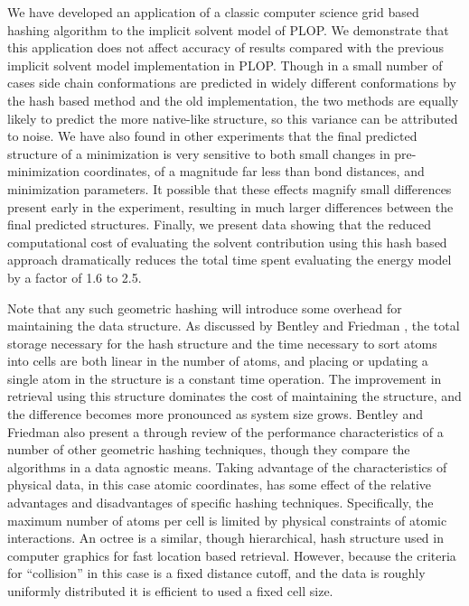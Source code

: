 We have developed an application of a classic computer science grid based hashing algorithm to the implicit solvent model of PLOP.
We demonstrate that this application does not affect accuracy of results compared with the previous implicit solvent model implementation in PLOP.
Though in a small number of cases side chain conformations are predicted in widely different conformations by the hash based method and the old implementation, the two methods are equally likely to predict the more native-like structure, so this variance can be attributed to noise.
We have also found in other experiments that the final predicted structure of a minimization is very sensitive to both small changes in pre-minimization coordinates, of a magnitude far less than bond distances, and minimization parameters.
It possible that these effects magnify small differences present early in the experiment, resulting in much larger differences between the final predicted structures.
Finally, we present data showing that the reduced computational cost of evaluating the solvent contribution using this hash based approach dramatically reduces the total time spent evaluating the energy model by a factor of 1.6 to 2.5.

Note that any such geometric hashing will introduce some overhead for maintaining the data structure.
As discussed by Bentley and Friedman \cite{bentley1979data}, the total storage necessary for the hash structure and the time necessary to sort atoms into cells are both linear in the number of atoms, and placing or updating a single atom in the structure is a constant time operation.
The improvement in retrieval using this structure dominates the cost of maintaining the structure, and the difference becomes more pronounced as system size grows.
Bentley and Friedman also present a through review of the performance characteristics of a number of other geometric hashing techniques, though they compare the algorithms in a data agnostic means.
Taking advantage of the characteristics of physical data, in this case atomic coordinates, has some effect of the relative advantages and disadvantages of specific hashing techniques. 
Specifically, the maximum number of atoms per cell is limited by physical constraints of atomic interactions.
An octree is a similar, though hierarchical, hash structure used in computer graphics for fast location based retrieval.
However, because the criteria for ``collision'' in this case is a fixed distance cutoff, and the data is roughly uniformly distributed it is efficient to used a fixed cell size\cite{turk1989interactive}.

